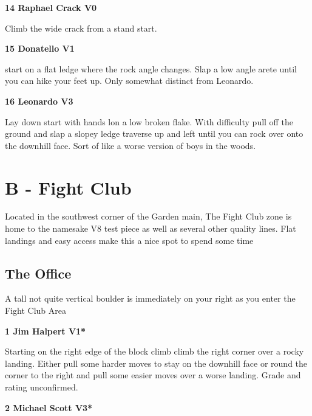 \begin{multicols}{2}
					\label{rt:Raphael Crack}
\colorbox{green!20}{
\parbox{0.95\linewidth}{
\textbf{
14 Raphael Crack V0  
}
}
}

					\begin{adjustwidth}{0.5cm}{}				
					Climb the wide crack from a stand start.
					\end{adjustwidth}
					\label{rt:Donatello}
\colorbox{green!20}{
\parbox{0.95\linewidth}{
\textbf{
15 Donatello V1  
}
}
}

					\begin{adjustwidth}{0.5cm}{}				
					start on a flat ledge where the rock angle changes. Slap a low angle arete until you can hike your feet up. Only somewhat distinct from Leonardo.
					\end{adjustwidth}
					\label{rt:Leonardo}
\colorbox{green!20}{
\parbox{0.95\linewidth}{
\textbf{
16 Leonardo V3  
}
}
}

					\begin{adjustwidth}{0.5cm}{}				
					Lay down start with hands lon a low broken flake. With difficulty pull off the ground and slap a slopey ledge traverse up and left until you can rock over onto the downhill face. Sort of like a worse version of boys in the woods.
					\end{adjustwidth}
\newpage

		\section{B - Fight Club}\label{sa:Fight Club}
	Located in the southwest corner of the Garden main, The Fight Club zone is home to the namesake V8 test piece as well as several other quality lines. Flat landings and easy access make this a nice spot to spend some time\\

	
			\subsection*{The Office}\label{bf:The Office}
			A tall not quite vertical boulder is immediately on your right as you enter the Fight Club Area\\
			
					\label{rt:Jim Halpert}
\colorbox{green!20}{
\parbox{0.95\linewidth}{
\textbf{
1 Jim Halpert V1*  \warn\warn
}
}
}

					\begin{adjustwidth}{0.5cm}{}				
					Starting on the right edge of the block climb climb the right corner over a rocky landing. Either pull some harder moves to stay on the downhill face or round the corner to the right and pull some easier moves over a worse landing. Grade and rating unconfirmed.
					\end{adjustwidth}
					\label{rt:Michael Scott}
\colorbox{green!20}{
\parbox{0.95\linewidth}{
\textbf{
2 Michael Scott V3*  \warn\warn
}
}
}


\end{multicols}
